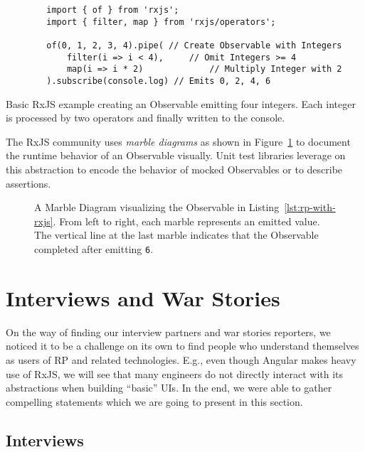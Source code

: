 \documentclass[12pt,a4paper]{article}
\begin{document}
\begin{listing}[H]
	\begin{verbatim}
		import { of } from 'rxjs';
		import { filter, map } from 'rxjs/operators';

		of(0, 1, 2, 3, 4).pipe(	// Create Observable with Integers
			filter(i => i < 4),		// Omit Integers >= 4
			map(i => i * 2)				// Multiply Integer with 2
		).subscribe(console.log) // Emits 0, 2, 4, 6
	\end{verbatim}
	\caption{Basic RxJS example creating an Observable emitting four integers. Each integer is processed by two operators and finally written to the console.}
	\label{lst:rp-with-rxjs}
\end{listing}


The RxJS community uses \emph{marble diagrams} as shown in Figure~\ref{fig:marble-diagram} to document \cite{marblediagrams} the runtime behavior of an Observable visually. Unit test libraries\cite{marbletesting} leverage on this abstraction to encode the behavior of mocked Observables or to describe assertions.

\begin{figure}[H]
	\centering
	\caption{A Marble Diagram visualizing the Observable in Listing~\ref{lst:rp-with-rxjs}. From left to right, each marble represents an emitted value. The vertical line at the last marble indicates that the Observable completed after emitting \texttt{6}.}
	\label{fig:marble-diagram}
\end{figure}



\section{Interviews and War Stories}
\label{sec:interviews}

On the way of finding our interview partners and war stories reporters, we noticed it to be a challenge on its own to find people who understand themselves as users of RP and related technologies. E.g., even though Angular makes heavy use of RxJS, we will see that many engineers do not directly interact with its abstractions when building ``basic'' UIs. In the end, we were able to gather compelling statements which we are going to present in this section.

\subsection{Interviews}
\end{document}
